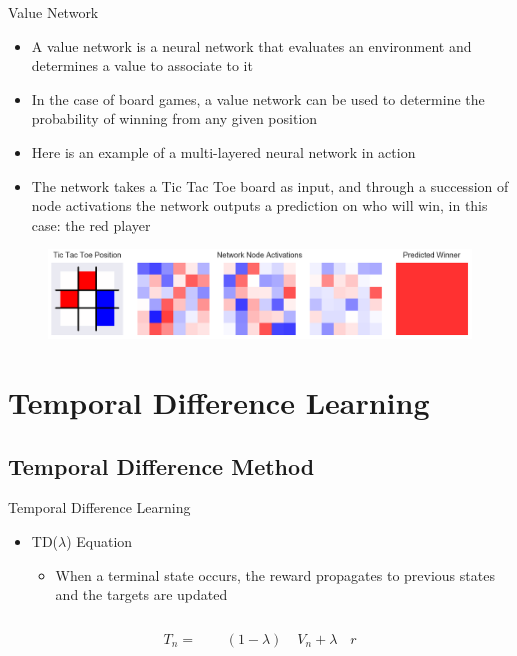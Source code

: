 \begin{frame}{Value Network}
\begin{itemize}
\item A value network is a neural network that evaluates an environment and determines a value to associate to it
\item In the case of board games, a value network can be used to determine the probability of winning from any given position
\item Here is an example of a multi-layered neural network in action
\item The network takes a Tic Tac Toe board as input, and through a succession of node activations the network outputs a prediction on who will win, in this case: the red player
\end{itemize}
\begin{figure}
\includegraphics[width=1. \textwidth]{network_weights}
\end{figure}
\end{frame}

\section{Temporal Difference Learning}
\subsection{Temporal Difference Method}
\begin{frame}{Temporal Difference Learning}
\begin{itemize}
\item TD($\lambda$) Equation
\begin{itemize}
\item When a terminal state occurs, the reward propagates to previous states and the targets are updated
\end{itemize}
\end{itemize}
\begin{equation*}
T_n = \phantom{\sum_{n=0}^{N_0} }(1-\lambda)\phantom{\lambda^n} V_n + \lambda^{\phantom{N_0}} r
\end{equation*}
\end{frame}

